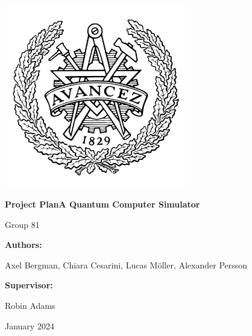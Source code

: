 \documentclass{article}
\begin{document}
\begin{titlepage}
    \centering
    \includegraphics[width=0.6\textwidth]{assets/chalmers_logo.png} %

    \vspace{2cm}
    
    {\huge \textbf{Project Plan\break A Quantum Computer Simulator} \par}
    {\large Group 81}

    \vspace{1.5cm}

    \vfill
    
    {\large\bfseries Authors:\par}
    {\Large Axel Bergman, Chiara Cesarini, Lucas Möller, Alexander Persson\par}
    
    \vspace{1cm}
    
    {\large\bfseries Supervisor:\par}
    {\Large Robin Adams\par}
    
    \vspace{1cm}
    
    {\large January 2024\par}
    
\end{titlepage}

\newpage
\tableofcontents

\newpage


\newpage


\newpage


\newpage


\newpage


\newpage


\newpage

\newpage



\end{document}

